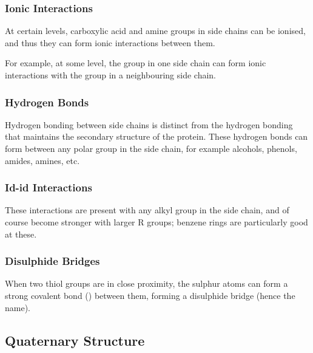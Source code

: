 			\subsubsection{Ionic Interactions}

				At certain \pH{} levels, carboxylic acid and amine groups in side chains can be ionised, and thus they can form ionic
				interactions between them.

				For example, at some \pH{} level, the  group in one side chain can form ionic interactions with the  group
				in a neighbouring side chain.



			\subsubsection{Hydrogen Bonds}

				Hydrogen bonding between side chains is distinct from the hydrogen bonding that maintains the secondary structure of the protein.
				These hydrogen bonds can form between any polar group in the side chain, for example alcohols, phenols, amides, amines, etc.



			\subsubsection{Id-id Interactions}

				These \idid{} interactions are present with any alkyl group in the side chain, and of course become
				stronger with larger R groups; benzene rings are particularly good at these.



			\subsubsection{Disulphide Bridges}

				When two thiol  groups are in close proximity, the sulphur atoms can form a strong covalent bond () between them,
				forming a disulphide bridge (hence the name).




		\subsection{Quaternary Structure}

